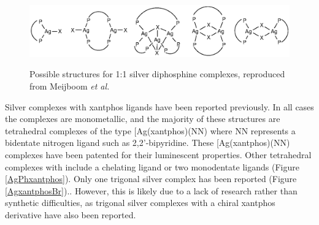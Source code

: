 \begin{figure}[h] 
\begin{center}
\vspace{0.5cm}
\includegraphics[scale=0.8]{../Figures/Possiblesilverstructures.eps}
\caption[1:1 silver diphosphine complexes]{Possible structures for 1:1 silver diphosphine complexes, reproduced from Meijboom \emph{et al.}\cite{Meijboom2009}}
\vspace{0.2cm}
\label{Silverstructures}
\end{center}
\end{figure}
\vspace{0.2cm}


Silver complexes with xantphos ligands have been reported previously.\cite{Malaise2006, Balakrishna2008}  In all cases the complexes are monometallic, and the majority of these structures are tetrahedral complexes of the type [Ag(xantphos)(NN)\ce{]+} where NN represents a bidentate nitrogen ligand such as 2,2'-bipyridine.  These [Ag(xantphos)(NN)\ce{]+} complexes have been patented for their luminescent properties.\cite{Kobayashi2010, Kobayashi2011a, Kobayashi2012a} Other tetrahedral complexes with \Phxantphos{} include a chelating ligand or two monodentate ligands (Figure \ref{AgPhxantphos}).  Only one trigonal silver \Phxantphos{} complex has been reported (Figure \ref{AgxantphosBr}).\cite{Kaltzoglou2007}.  However, this is likely due to a lack of research rather than synthetic difficulties, as trigonal silver complexes with a chiral xantphos derivative have also been reported.\cite{Malaise2006}

